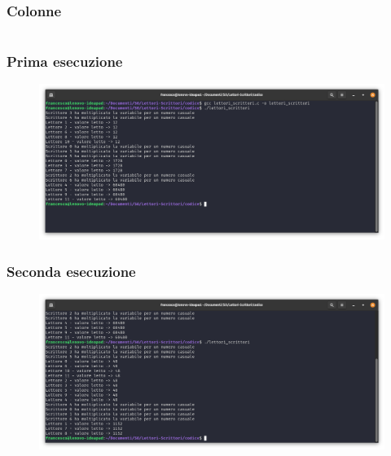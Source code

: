 \documentclass{beamer}[10pt]
\begin{document}
	\begin{frame}
		\frametitle{Colonne}
		\begin{columns}
			\begin{column}{0.4\textwidth}
			
			\end{column}
			\begin{column}{0.4\textwidth}
				
			\end{column}
		\end{columns}
	\end{frame}

	\begin{frame}[fragile]
		\frametitle{Prima esecuzione}
		\begin{figure}
			\centering
			\includegraphics[width=1.03\linewidth]{img/esecuzione/programC1}
			\label{fig:programc1}
		\end{figure}
	\end{frame}
	\begin{frame}[fragile]
		\frametitle{Seconda esecuzione}
		\begin{figure}
			\centering
			\includegraphics[width=1.03\linewidth]{img/esecuzione/programC2}
			\label{fig:programc1}
		\end{figure}
	\end{frame}
\end{document}
